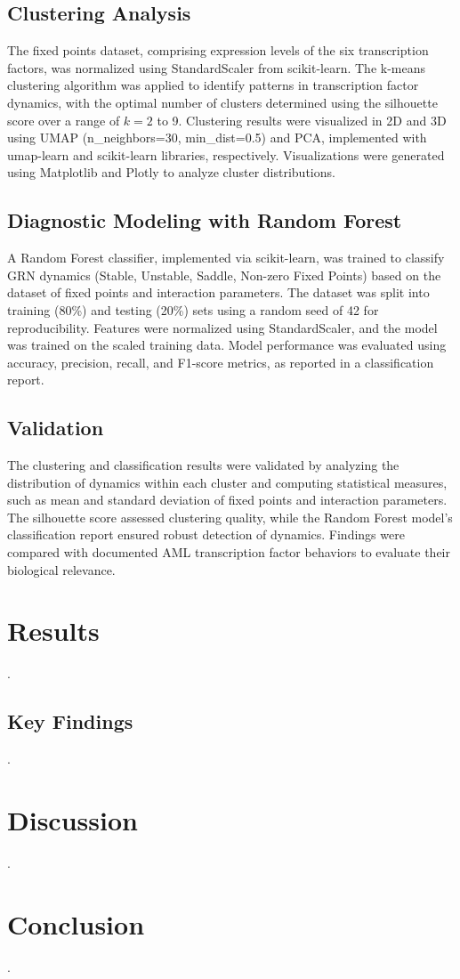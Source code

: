 \documentclass[a4paper,12pt]{article}
\begin{document}
\subsection{Clustering Analysis}
\label{subsec:clustering}
The fixed points dataset, comprising expression levels of the six transcription factors, was normalized using StandardScaler from scikit-learn. The k-means clustering algorithm was applied to identify patterns in transcription factor dynamics, with the optimal number of clusters determined using the silhouette score over a range of \( k = 2 \) to 9. Clustering results were visualized in 2D and 3D using UMAP (n\_neighbors=30, min\_dist=0.5) and PCA, implemented with umap-learn and scikit-learn libraries, respectively. Visualizations were generated using Matplotlib and Plotly to analyze cluster distributions.

\subsection{Diagnostic Modeling with Random Forest}
\label{subsec:diagnostic_modeling}
A Random Forest classifier, implemented via scikit-learn, was trained to classify GRN dynamics (Stable, Unstable, Saddle, Non-zero Fixed Points) based on the dataset of fixed points and interaction parameters. The dataset was split into training (80\%) and testing (20\%) sets using a random seed of 42 for reproducibility. Features were normalized using StandardScaler, and the model was trained on the scaled training data. Model performance was evaluated using accuracy, precision, recall, and F1-score metrics, as reported in a classification report.

\subsection{Validation}
\label{subsec:validation}
The clustering and classification results were validated by analyzing the distribution of dynamics within each cluster and computing statistical measures, such as mean and standard deviation of fixed points and interaction parameters. The silhouette score assessed clustering quality, while the Random Forest model’s classification report ensured robust detection of dynamics. Findings were compared with documented AML transcription factor behaviors to evaluate their biological relevance.

\clearpage
\section{Results}
\label{sec:results}
.

\subsection{Key Findings}
.


\clearpage
\section{Discussion}
.

\clearpage
\section{Conclusion}
\label{sec:conclusion}
.
\end{document}

